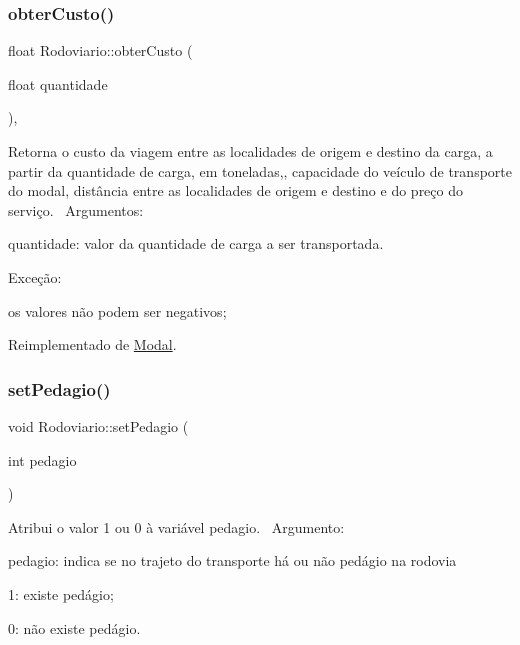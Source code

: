 \subsubsection{\texorpdfstring{obter\+Custo()}{obterCusto()}}
{\footnotesize\ttfamily float Rodoviario\+::obter\+Custo (\begin{DoxyParamCaption}\item[{float}]{quantidade }\end{DoxyParamCaption})\hspace{0.3cm}{\ttfamily [override]}, {\ttfamily [virtual]}}

Retorna o custo da viagem entre as localidades de origem e destino da carga, a partir da quantidade de carga, em toneladas,, capacidade do veículo de transporte do modal, distância entre as localidades de origem e destino e do preço do serviço.~\newline
Argumentos\+:
\begin{DoxyItemize}
\item quantidade\+: valor da quantidade de carga a ser transportada.
\end{DoxyItemize}

Exceção\+:
\begin{DoxyItemize}
\item os valores não podem ser negativos;
\end{DoxyItemize}

Reimplementado de \hyperlink{classModal_a20cee7247cce33806d681e1d60347cc5}{Modal}.

\mbox{\label{classRodoviario_a14273f1bc7d5a0b237846749fbe2221e}} 
\subsubsection{\texorpdfstring{set\+Pedagio()}{setPedagio()}}
{\footnotesize\ttfamily void Rodoviario\+::set\+Pedagio (\begin{DoxyParamCaption}\item[{int}]{pedagio }\end{DoxyParamCaption})}

Atribui o valor 1 ou 0 à variável pedagio.~\newline
 Argumento\+:
\begin{DoxyItemize}
\item pedagio\+: indica se no trajeto do transporte há ou não pedágio na rodovia
\begin{DoxyItemize}
\item 1\+: existe pedágio;
\item 0\+: não existe pedágio.
\end{DoxyItemize}
\end{DoxyItemize}

